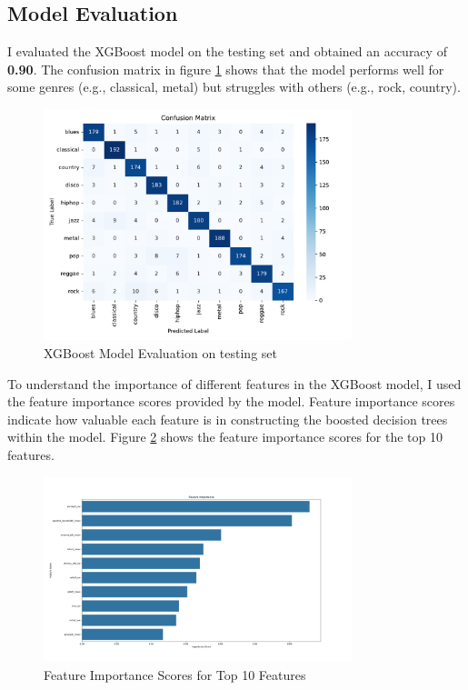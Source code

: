 \documentclass[11.5pt]{article}
\begin{document}
\subsection{Model Evaluation}
I evaluated the XGBoost model on the testing set and obtained an accuracy of \textbf{0.90}. The confusion matrix in figure \ref{fig:xgboost_evaluation} shows that the model performs well for some genres (e.g., classical, metal) but struggles with others (e.g., rock, country).
\begin{figure}[H]
    \centering
    \includegraphics[width=0.8\textwidth]{graphics/confusion_matrix.pdf}
    \caption{XGBoost Model Evaluation on testing set}
    \label{fig:xgboost_evaluation}
\end{figure}

To understand the importance of different features in the XGBoost model, I used the feature importance scores provided by the model. Feature importance scores indicate how valuable each feature is in constructing the boosted decision trees within the model. Figure \ref{fig:feature_importance} shows the feature importance scores for the top 10 features.


\begin{figure}[H]
    \centering
    \includegraphics[width=0.8\textwidth]{graphics/feature_importance.pdf}
    \caption{Feature Importance Scores for Top 10 Features}
    \label{fig:feature_importance}
\end{figure}
\end{document}
